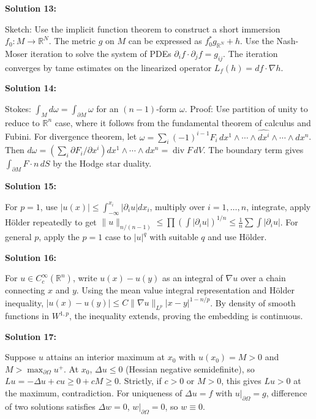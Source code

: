 \documentclass[12pt,a4paper]{exam}
\begin{document}
\vspace{0.5cm}

\textbf{Solution 13:}

Sketch: Use the implicit function theorem to construct a short immersion $f_0: M \to \mathbb{R}^N$. The metric $g$ on $M$ can be expressed as $f_0^*g_{\mathbb{R}^N} + h$. Use the Nash-Moser iteration to solve the system of PDEs $\partial_i f \cdot \partial_j f = g_{ij}$. The iteration converges by tame estimates on the linearized operator $L_f(h) = df \cdot \nabla h$.

\vspace{0.5cm}

\textbf{Solution 14:}

Stokes: $\int_M d\omega = \int_{\partial M} \omega$ for an $(n-1)$-form $\omega$. Proof: Use partition of unity to reduce to $\mathbb{R}^n$ case, where it follows from the fundamental theorem of calculus and Fubini. For divergence theorem, let $\omega = \sum_i (-1)^{i-1} F_i \, dx^1 \wedge \cdots \wedge \widehat{dx^i} \wedge \cdots \wedge dx^n$. Then $d\omega = (\sum_i \partial F_i/\partial x^i) dx^1 \wedge \cdots \wedge dx^n = \operatorname{div} F \, dV$. The boundary term gives $\int_{\partial M} F \cdot n \, dS$ by the Hodge star duality.

\vspace{0.5cm}

\textbf{Solution 15:}

For $p=1$, use $|u(x)| \leq \int_{-\infty}^{x_i} |\partial_i u| dx_i$, multiply over $i=1,\ldots,n$, integrate, apply H\"older repeatedly to get $\|u\|_{n/(n-1)} \leq \prod (\int |\partial_i u|)^{1/n} \leq \frac{1}{n} \sum \int |\partial_i u|$. For general $p$, apply the $p=1$ case to $|u|^q$ with suitable $q$ and use H\"older.

\vspace{0.5cm}

\textbf{Solution 16:}

For $u \in C_c^\infty(\mathbb{R}^n)$, write $u(x) - u(y)$ as an integral of $\nabla u$ over a chain connecting $x$ and $y$. Using the mean value integral representation and H\"older inequality, $|u(x) - u(y)| \leq C \|\nabla u\|_{L^p} |x-y|^{1-n/p}$. By density of smooth functions in $W^{1,p}$, the inequality extends, proving the embedding is continuous.

\vspace{0.5cm}

\textbf{Solution 17:}

Suppose $u$ attains an interior maximum at $x_0$ with $u(x_0) = M > 0$ and $M > \max_{\partial\Omega} u^+$. At $x_0$, $\Delta u \leq 0$ (Hessian negative semidefinite), so $Lu = -\Delta u + c u \geq 0 + cM \geq 0$. Strictly, if $c>0$ or $M>0$, this gives $Lu > 0$ at the maximum, contradiction. For uniqueness of $\Delta u = f$ with $u|_{\partial\Omega} = g$, difference of two solutions satisfies $\Delta w = 0$, $w|_{\partial\Omega} = 0$, so $w \equiv 0$.
\end{document}
